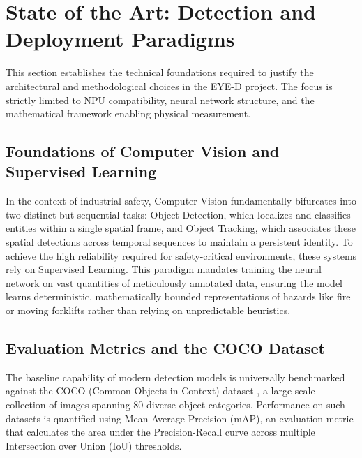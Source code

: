 \section{State of the Art: Detection and Deployment Paradigms}
\label{sec:cv-paradigms}

This section establishes the technical foundations required to justify the architectural and methodological choices in the EYE-D project. The focus is strictly limited to NPU compatibility, neural network structure, and the mathematical framework enabling physical measurement.

\subsection{Foundations of Computer Vision and Supervised Learning}
In the context of industrial safety, Computer Vision fundamentally bifurcates into two distinct but sequential tasks: Object Detection, which localizes and classifies entities within a single spatial frame, and Object Tracking, which associates these spatial detections across temporal sequences to maintain a persistent identity. To achieve the high reliability required for safety-critical environments, these systems rely on Supervised Learning. This paradigm mandates training the neural network on vast quantities of meticulously annotated data, ensuring the model learns deterministic, mathematically bounded representations of hazards like fire or moving forklifts rather than relying on unpredictable heuristics.

\subsection{Evaluation Metrics and the COCO Dataset}
The baseline capability of modern detection models is universally benchmarked against the COCO (Common Objects in Context) dataset \cite{ref:coco}, a large-scale collection of images spanning 80 diverse object categories. Performance on such datasets is quantified using Mean Average Precision (mAP), an evaluation metric that calculates the area under the Precision-Recall curve across multiple Intersection over Union (IoU) thresholds.

